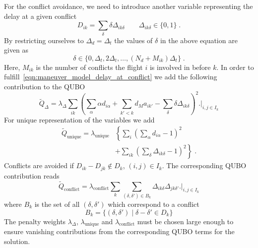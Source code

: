 For the conflict avoidance, we need to introduce another variable representing the delay at a given conflict
\begin{equation*}
    D_{ik} = \sum_\delta \delta \Delta_{ik\delta} \qquad \Delta_{ik\delta} \in \{0, 1\} \; .
\end{equation*}
By restricting ourselves to $\Delta_d = \Delta_t$ the values of $\delta$ in the above equation are given as
\begin{equation*}
    \delta \in \{0, \Delta_t, 2\Delta_t, \dots,  (N_d + M_{ik}) \Delta_t\} \; .
\end{equation*}
Here, $M_{ik}$ is the number of conflicts the flight $i$ is involved in before $k$.
In order to fulfill~\eqref{eqn:maneuver_model_delay_at_conflict} we add the following contribution to the QUBO
\begin{equation*}
  \tilde Q_\Delta = \lambda_\Delta \sum_{ik}  {\left( \sum_{\alpha} \alpha d_{i\alpha}  + \sum_{k'<k} d_M a_{ik'} - \sum_\delta \delta \Delta_{ik\delta}\right)}^2 \biggl. \biggr|_{i, j \in I_k}
\end{equation*}
For unique representation of the variables we add 
\begin{align*}
  \tilde Q_\text{unique} = \lambda_\text{unique} & \left\{  \sum_i {\left( \sum_\alpha d_{i\alpha} - 1 \right)}^2 \right. \\
  & \left. + \sum_{ik} {\left( \sum_\delta \Delta_{ik\delta} - 1 \right)}^2 \right\} \; .
\end{align*}
Conflicts are avoided if $D_{ik} - D_{jk} \notin D_k$, $(i, j) \in I_k$. 
The corresponding QUBO contribution reads
\begin{equation*}
    \tilde Q_\text{conflict} = \lambda_\text{conflict} \sum_k \sum_{(\delta, \delta') \in B_k} \Delta_{ik\delta} \Delta_{jk\delta'} \biggl. \biggr|_{i, j \in I_k}
\end{equation*}
where $B_k$ is the set of all $(\delta, \delta')$ which correspond to a conflict
\begin{equation*}
    B_k = \{(\delta, \delta') \; | \; \delta - \delta' \in D_k\}
\end{equation*}
The penalty weights $\lambda_\Delta$, $\lambda_\text{unique}$ and $\lambda_\text{conflict}$ must be chosen large enough to ensure vanishing contributions from the corresponding QUBO terms for the solution.

